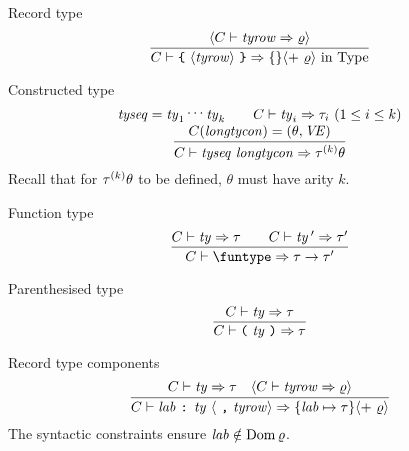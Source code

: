 \begin{sml-rule}{Record type}
\begin{equation}\label{rule:static-core:record-type}
  \vcenter{\infer{\C\ts\lttbrace\ \rectype\ \rttbrace\ra\emptymap\optional{ +\ \varrho}\ \In\ \Type}
    {\optional{\C\ts\labtys\ra\varrho}}}
\end{equation}
\end{sml-rule}

\begin{sml-rule}{Constructed type}
\begin{equation}\label{rule:static-core:constructed-type}
  \vcenter{\infer{\C\ts\constype\ra\tauk\theta}
    {\deduce{\C(\longtycon)=(\theta,\VE)}
      {\tyseq=\ty_{1}\syndots\ty_{k}\qquad\C\ts\ty_{i}\ra\tau_{i}\ (1\leq i\leq k)}}}
\end{equation}
Recall that for $\mbox{$\tau^{(k)}$}\theta$ to be defined, $\theta$ must have arity
$k$.
\end{sml-rule}

\begin{sml-rule}{Function type}
\begin{equation}\label{rule:static-core:function-type}
  \vcenter{\infer{\C\ts\funtype\ra\tau\to\tau'}
    {\C\ts\ty\ra\tau\qquad\C\ts\ty\,'\ra\tau'}}
\end{equation}
\end{sml-rule}

\begin{sml-rule}{Parenthesised type}
\begin{equation}\label{rule:static-core:parenthesised-type}
  \vcenter{\infer{\C\ts\partype\ra\tau}
    {\C\ts\ty\ra\tau}}
\end{equation}
\end{sml-rule}


\begin{sml-rule}{Record type components}
\begin{equation}\label{rule:static-core:record-type-components}
  \vcenter{\infer{\C\ts\longlabtys\ra\{\lab\mapsto\tau\}\optional{ +\ \varrho}}
    {\C\ts\ty\ra\tau
      & \optional{\C\ts\labtys\ra\varrho}}}
\end{equation}
The syntactic constraints ensure $\textit{lab\/}\notin\mathop{\rm Dom}\nolimits\varrho$.
\end{sml-rule}


